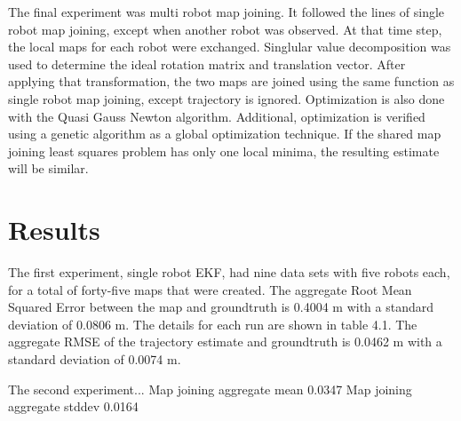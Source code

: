 \documentclass[12pt]{report}
\begin{document}
The final experiment was multi robot map joining.  It followed the lines of single robot map joining, except when another robot was observed.  At that time step, the local maps for each robot were exchanged.  Singlular value decomposition was used to determine the ideal rotation matrix and translation vector.  After applying that transformation, the two maps are joined using the same function as single robot map joining, except trajectory is ignored.  Optimization is also done with the Quasi Gauss Newton algorithm.  Additional, optimization is verified using a genetic algorithm as a global optimization technique.  If the shared map joining least squares problem has only one local minima, the resulting estimate will be similar.  

\chapter{Results}

The first experiment, single robot EKF, had nine data sets with five robots each, for a total of forty-five maps that were created.  The aggregate Root Mean Squared Error between the map and groundtruth is 0.4004 m with a standard deviation of 0.0806 m.  The details for each run are shown in table 4.1.  The aggregate RMSE of the trajectory estimate and groundtruth is 0.0462 m with a standard deviation of 0.0074 m.  

The second experiment...
Map joining aggregate mean 0.0347
Map joining aggregate stddev 0.0164
\end{document}
